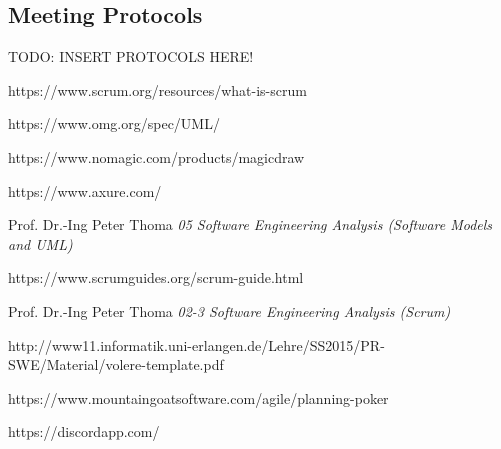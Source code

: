\documentclass[a4paper, 12pt]{article}
\begin{document}
\newpage
\subsection{Meeting Protocols}
\color{red}TODO: INSERT PROTOCOLS HERE! \color{black}

\newpage
\listoffigures


\newpage
\begin{thebibliography}{}

https://www.scrum.org/resources/what-is-scrum

https://www.omg.org/spec/UML/

https://www.nomagic.com/products/magicdraw

https://www.axure.com/

Prof. Dr.-Ing Peter Thoma \emph{05 Software Engineering Analysis (Software Models and UML)}

https://www.scrumguides.org/scrum-guide.html

Prof. Dr.-Ing Peter Thoma \emph{02-3 Software Engineering Analysis (Scrum)}

http://www11.informatik.uni-erlangen.de/Lehre/SS2015/PR-SWE/Material/volere-template.pdf

https://www.mountaingoatsoftware.com/agile/planning-poker

https://discordapp.com/

\end{thebibliography}
\end{document}
